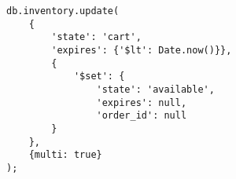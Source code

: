 \medskip
\begin{lstlisting}[caption= Ejemplo de \scriptPL corriendo \backgroundPL., label=source:javascript:example_add_script_background_mongodb]
db.inventory.update(
    {
        'state': 'cart',
        'expires': {'$lt': Date.now()}},
        {
            '$set': {
                'state': 'available',
                'expires': null,
                'order_id': null
        }
    },
    {multi: true}
);
\end{lstlisting} 
